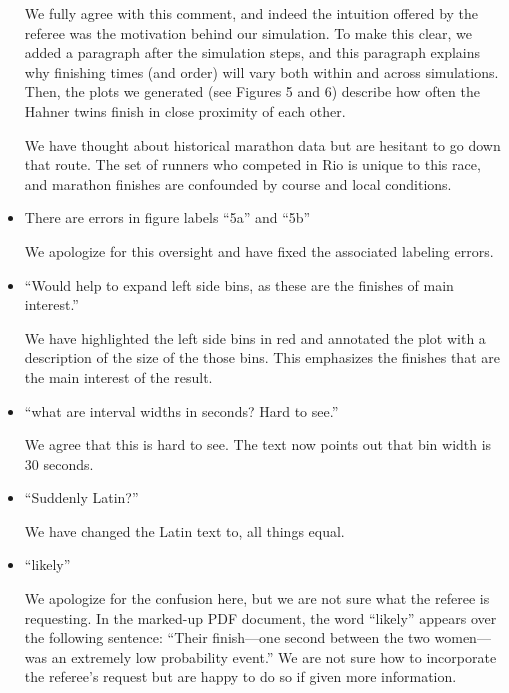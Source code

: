 \documentclass[12pt]{article}
\begin{document}
\begin{itemize}
  We fully agree with this comment, and indeed the intuition offered
  by the referee was the motivation behind our simulation.  To make
  this clear, we added a paragraph after the simulation steps, and
  this paragraph explains why finishing times (and order) will vary
  both within and across simulations.  Then, the plots we generated
  (see Figures 5 and 6) describe how often the Hahner twins finish
  in close proximity of each other.

  We have thought about historical marathon data but are hesitant to
  go down that route.  The set of runners who competed in Rio is
  unique to this race, and marathon finishes are confounded by course
  and local conditions.
  
\item There are errors in figure labels ``5a'' and ``5b''
  
  We apologize for this oversight and have fixed the associated
  labeling errors.

\item ``Would help to expand left side bins, as these are the finishes
  of main interest.''
  
  We have highlighted the left side bins in red and annotated the plot 
  with a description of the size of the those bins. This emphasizes the finishes
  that are the main interest of the result.

\item ``what are interval widths in seconds? Hard to see.''

  We agree that this is hard to see.  The text now points out that bin
  width is 30 seconds.

\item ``Suddenly Latin?''
  
  We have changed the Latin text to, all things equal.
  
\item ``likely''

  We apologize for the confusion here, but we are not sure what the
  referee is requesting.  In the marked-up PDF document, the word
  ``likely'' appears over the following sentence: ``Their finish—one
  second between the two women—was an extremely low probability
  event.''  We are not sure how to incorporate the referee's request
  but are happy to do so if given more information.

\end{itemize}

 
\end{document}
